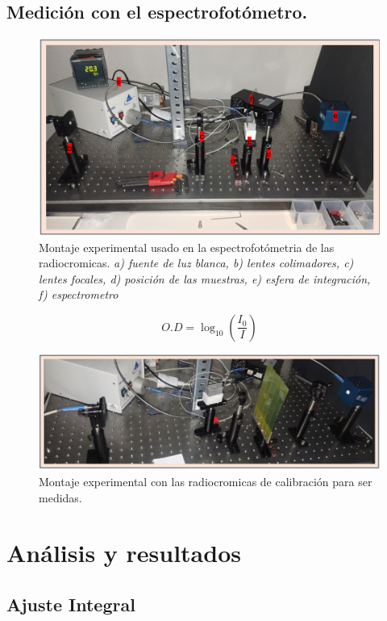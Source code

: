 \documentclass[onecolumn,12pt]{article} %
\begin{document}
\subsection{Medición con el espectrofotómetro.}

\begin{figure}[H]
    \centering
    \includegraphics[width=0.7\linewidth]{img_Esp/montaje_espectrometria.png}
    \caption{Montaje experimental usado en la espectrofotómetria de las radiocromicas. \textit{ a) fuente de luz blanca, b) lentes colimadores, c) lentes focales, d) posición de las muestras, e) esfera de integración, f) espectrometro }  }
    \label{fig:setup_esp}
\end{figure}
\begin{equation}
O.D = \log_{10} \left(\frac{I_0}{I}\right)    
\end{equation}

\begin{figure}[H]
    \centering
    \includegraphics[width=0.7\linewidth]{img_Esp/montaje_espectrometria_conRadiocromica.png}
    \caption{Montaje experimental con las radiocromicas de calibración para ser medidas.}
    \label{fig:setup_espConRC}
\end{figure}



\section{Análisis y resultados}


\subsection{Ajuste Integral}
\end{document}
